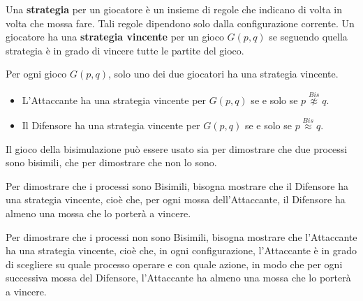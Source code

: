 Una \textbf{strategia} per un giocatore è un insieme di regole che indicano di volta in volta che mossa fare. Tali regole dipendono solo dalla configurazione corrente. Un giocatore ha una \textbf{strategia vincente} per un gioco $G(p, q)$ se seguendo quella strategia è in grado di vincere tutte le partite del gioco.
\begin{teorema}
    Per ogni gioco $G(p, q)$, solo uno dei due giocatori ha una strategia vincente.
\end{teorema}
\begin{teorema}
    \begin{itemize}
        \item L'Attaccante ha una strategia vincente per $G(p, q)$ se e solo se $p \stackrel{Bis}{\not\approx} q$.
        \item Il Difensore ha una strategia vincente per $G(p, q)$ se e solo se  $p \stackrel{Bis}{\approx} q$.
    \end{itemize}
\end{teorema}
\begin{nota}
    Il gioco della bisimulazione può essere usato sia per dimostrare che due processi sono bisimili, che per dimostrare che non lo sono.
\end{nota}
Per dimostrare che i processi sono Bisimili, bisogna mostrare che il Difensore ha una strategia vincente, cioè che, per ogni mossa dell'Attaccante, il Difensore ha almeno una mossa che lo porterà a vincere.

Per dimostrare che i processi non sono Bisimili, bisogna mostrare che l'Attaccante ha una strategia vincente, cioè che, in ogni configurazione, l'Attaccante è in grado di scegliere su quale processo operare e con quale azione, in modo che per ogni successiva mossa del Difensore, l'Attaccante ha almeno una mossa che lo porterà a vincere.
